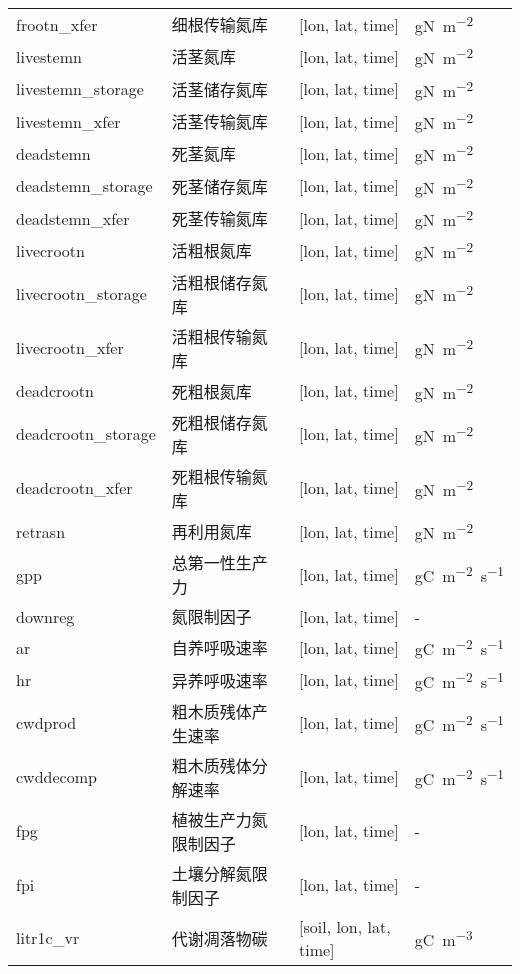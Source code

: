 {\begin{longtable}[htbp]{lp{}ll}
frootn\_xfer     & 细根传输氮库 & {[}lon, lat, time{]} & \unit{gN.m^{-2}} \\
livestemn      & 活茎氮库 & {[}lon, lat, time{]}  & \unit{gN.m^{-2}} \\
livestemn\_storage  & 活茎储存氮库 & {[}lon, lat, time{]} & \unit{gN.m^{-2}} \\
livestemn\_xfer   & 活茎传输氮库 & {[}lon, lat, time{]} & \unit{gN.m^{-2}} \\
deadstemn      & 死茎氮库 & {[}lon, lat, time{]}  & \unit{gN.m^{-2}} \\
deadstemn\_storage  & 死茎储存氮库 & {[}lon, lat, time{]} & \unit{gN.m^{-2}} \\
deadstemn\_xfer   & 死茎传输氮库 & {[}lon, lat, time{]} & \unit{gN.m^{-2}} \\
livecrootn & 活粗根氮库 & {[}lon, lat, time{]}  & \unit{gN.m^{-2}} \\
livecrootn\_storage & 活粗根储存氮库 & {[}lon, lat, time{]} & \unit{gN.m^{-2}} \\
livecrootn\_xfer & 活粗根传输氮库 & {[}lon, lat, time{]}  & \unit{gN.m^{-2}} \\
deadcrootn & 死粗根氮库 & {[}lon, lat, time{]}  & \unit{gN.m^{-2}} \\
deadcrootn\_storage & 死粗根储存氮库 & {[}lon, lat, time{]} & \unit{gN.m^{-2}} \\
deadcrootn\_xfer & 死粗根传输氮库 & {[}lon, lat, time{]}  & \unit{gN.m^{-2}} \\
retrasn & 再利用氮库 & {[}lon, lat, time{]}  & \unit{gN.m^{-2}} \\
gpp & 总第一性生产力 & {[}lon, lat, time{]}  & \unit{gC.m^{-2}.s^{-1}} \\
downreg & 氮限制因子 & {[}lon, lat, time{]}  & - \\
ar & 自养呼吸速率 & {[}lon, lat, time{]}  & \unit{gC.m^{-2}.s^{-1}} \\
hr & 异养呼吸速率 &  {[}lon, lat, time{]}  & \unit{gC.m^{-2}.s^{-1}} \\
cwdprod & 粗木质残体产生速率 &  {[}lon, lat, time{]}  & \unit{gC.m^{-2}.s^{-1}} \\
cwddecomp & 粗木质残体分解速率 &  {[}lon, lat, time{]}  & \unit{gC.m^{-2}.s^{-1}} \\
fpg & 植被生产力氮限制因子 &  {[}lon, lat, time{]}  & - \\
fpi & 土壤分解氮限制因子 &  {[}lon, lat, time{]}  & - \\
litr1c\_vr & 代谢凋落物碳 & {[}soil, lon, lat, time{]}  & \unit{gC.m^{-3}} \\

\end{longtable}}

